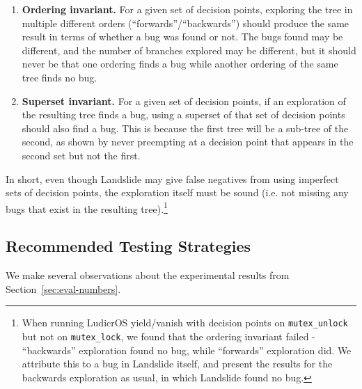 \begin{enumerate}
	\item {\bf Ordering invariant.} For a given set of decision points, exploring the tree in multiple different orders (``forwards''/``backwards'') should produce the same result in terms of whether a bug was found or not. The bugs found may be different, and the number of branches explored may be different, but it should never be that one ordering finds a bug while another ordering of the same tree finds no bug.
	\item {\bf Superset invariant.} For a given set of decision points, if an exploration of the resulting tree finds a bug, using a superset of that set of decision points should also find a bug. This is because the first tree will be a sub-tree of the second, as shown by never preempting at a decision point that appears in the second set but not the first.
\end{enumerate}

In short, even though Landslide may give false negatives from using imperfect sets of decision points, the exploration itself must be sound (i.e. not missing any bugs that exist in the resulting tree).\footnote{
When running LudicrOS yield/vanish with decision points on \texttt{mutex\_unlock} but not on \texttt{mutex\_lock}, we found that the ordering invariant failed - ``backwards'' exploration found no bug, while ``forwards'' exploration did. We attribute this to a bug in Landslide itself, and present the results for the backwards exploration as usual, in which Landslide found no bug.}

\subsection{Recommended Testing Strategies}
\label{sec:discussion-strategies}

We make several observations about the experimental results from Section~\ref{sec:eval-numbers}.

